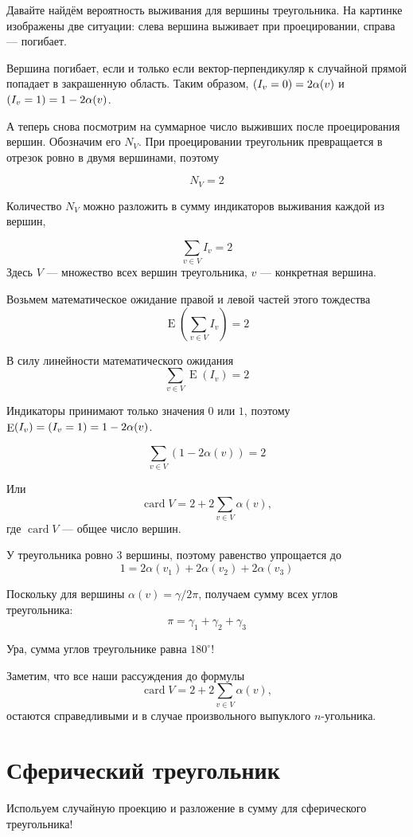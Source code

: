 \documentclass[12pt]{article} %
\theoremstyle{definition} %
\DeclareMathOperator{\E}{E}
\DeclareMathOperator{\card}{card}
\let\P\relax
\DeclareMathOperator{\P}{P}
\begin{document}
Давайте найдём вероятность выживания для вершины треугольника.
На картинке изображены две ситуации: слева вершина выживает при проецировании, справа — погибает.


Вершина погибает, если и только если вектор-перпендикуляр к случайной прямой попадает в закрашенную область.
Таким образом, $\P(I_v = 0) = 2 \alpha(v)$ и $\P(I_v = 1) = 1 - 2\alpha(v)$.

А теперь снова посмотрим на суммарное число выживших после проецирования вершин.
Обозначим его $N_V$. 
При проецировании треугольник превращается в отрезок ровно в двумя вершинами, поэтому

\[
N_V = 2
\]

Количество $N_V$ можно разложить в сумму индикаторов выживания каждой из вершин,

\[
\sum_{v \in V} I_v = 2
\]
Здесь $V$ — множество всех вершин треугольника, $v$ — конкретная вершина.


Возьмем математическое ожидание правой и левой частей этого тождества
\[
\E(\sum_{v \in V} I_v) = 2
\]

В силу линейности математического ожидания
\[
\sum_{v\in V} \E(I_v) = 2
\]

Индикаторы принимают только значения $0$ или $1$, поэтому $\E(I_v) = \P(I_v = 1) = 1 - 2\alpha(v)$.

\[
\sum_{v\in V} (1 - 2\alpha(v)) = 2
\]

Или 
\[
\card V = 2 + 2 \sum_{v\in V} \alpha(v), 
\]
где $\card V$ — общее число вершин.

У треугольника ровно 3 вершины, поэтому равенство упрощается до
\[
1 = 2\alpha(v_1) + 2\alpha(v_2) + 2\alpha(v_3)
\]

Поскольку для вершины $\alpha(v) = \gamma / 2\pi$, получаем сумму всех углов треугольника:
\[
\pi = \gamma_1 + \gamma_2 + \gamma_3
\]

Ура, сумма углов треугольнике равна $180^{\circ}$!

Заметим, что все наши рассуждения до формулы
\[
\card V = 2 + 2 \sum_{v\in V} \alpha(v), 
\]
остаются справедливыми и в случае произвольного выпуклого $n$-угольника. 


\section{Сферический треугольник}

Испольуем случайную проекцию и разложение в сумму для сферического треугольника!
\end{document}
